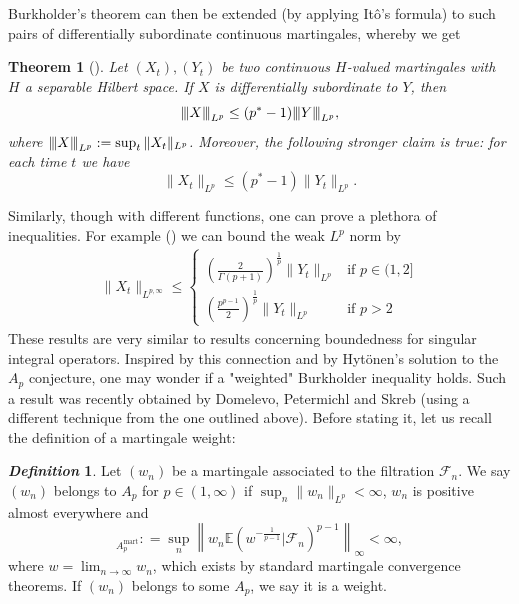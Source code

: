 \documentclass[11pt, a4paper]{amsart}
\newtheorem{theorem}{Theorem}[section]
\theoremstyle{definition}
\newtheorem{definition}{\textsl{Definition}}
\theoremstyle{remark}
\newcommand{\vvvert}[1]{
    {\left\vert\kern-0.25ex\left\vert\kern-
    0.25ex\left\vert #1 
    \right\vert\kern-0.25ex\right\vert\kern-
    0.25ex\right\vert}
}
\begin{document}
Burkholder's theorem can then be extended
(by applying Itô's formula)
to such pairs of differentially
subordinate continuous martingales,
whereby we get
\begin{theorem}[{\cite[Theorem 5.7]{osekowski}}]
\label{thm:burkholder}
Let $(X_t), (Y_t)$ be two continuous $H$-valued
martingales with $H$ a separable Hilbert space. If $X$
is differentially subordinate to $Y$, then
\begin{equation}
\vvvert{X}_{L^p}\le (p^*-1)\vvvert{Y}_{L^p},
\label{eq:Burkholder}
\end{equation}
where $\vvvert{X}_{L^p}\mathrel{:}=
\sup_t \|X_t\|_{L^p}$.
Moreover, the following stronger claim is true:
for each time $t$ we have
\begin{equation}
\|X_t\|_{L^p}\le (p^*-1)\|Y_t\|_{L^p}.
\label{eq:Burkholderpointwise}
\end{equation}
\end{theorem}
Similarly, though with different functions,
one can prove a plethora of inequalities.
For example (\cite[Theorem 3.2, Theorem 5.7]{osekowski})
we can bound the weak $L^p$ norm by
\begin{align*}
\|X_t\|_{L^{p,\infty}}\le
    \begin{cases}
    \left(\frac{2}{\Gamma(p+1)}\right)^{\frac1p}
    \|Y_t\|_{L^p}
    &\text{if $p\in(1,2]$}\\ 
    \left(\frac{p^{p-1}}2\right)^{\frac1p}
    \|Y_t\|_{L^p}&\text{if $p>2$}
    \end{cases}
\end{align*}
These results are very similar to results concerning
boundedness for singular integral operators.
Inspired by this connection and by
Hytönen's solution to the $A_p$
conjecture, one may wonder if a "weighted"
Burkholder inequality holds.
Such a result was recently obtained by Domelevo,
Petermichl and Skreb
\cite{Petermichl} (using a different technique
from the one outlined above).
Before stating it, let us recall the definition
of a martingale weight:
\begin{definition}\label{def:weightmart}
Let $(w_n)$ be a martingale associated to
the filtration $\mathcal F_n$.
We say $(w_n)$ belongs to $A_p$ for $p\in (1,\infty)$
if $\sup_n \|w_n\|_{L^p}<\infty$, $w_n$ is positive
almost everywhere and
\begin{equation*}
[w]_{A_p^{\text{mart}}}
\mathrel{:}=
\sup_n \left\|w_n \mathbb E(w^{-\frac1{p-1}}
|\mathcal F_n)^{p-1}
\right\|_\infty<\infty,
\end{equation*}
where $w=\lim_{n\to \infty} w_n$, which exists by standard martingale
convergence theorems.
If $(w_n)$ belongs to some $A_p$, we say it is a weight.
\end{definition}
\end{document}
